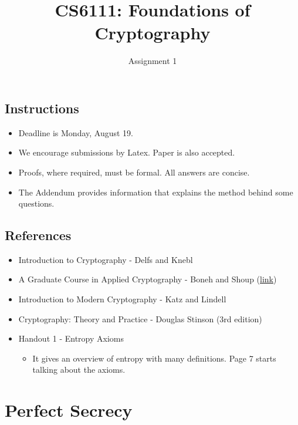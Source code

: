\documentclass[10pt]{exam}
\title{CS6111: Foundations of Cryptography}
\author{Assignment 1}
\date{}
\begin{document}
\maketitle

\subsection*{Instructions} 
\begin{itemize}
    \item Deadline is Monday, August 19.
    \item We encourage submissions by Latex. Paper is also accepted. 
    \item Proofs, where required, must be formal. All answers are concise.
    \item The Addendum provides information that explains the method behind some questions.
\end{itemize}


\subsection*{References} 
\begin{itemize}\itemsep0em
    \item Introduction to Cryptography - Delfs and Knebl
    \item A Graduate Course in Applied Cryptography - Boneh and Shoup (\href{https://crypto.stanford.edu/~dabo/cryptobook}{link})
    \item Introduction to Modern Cryptography - Katz and Lindell 
    
    \item Cryptography: Theory and Practice - Douglas Stinson (3rd edition)
    \item Handout 1 - Entropy Axioms
            \begin{itemize}
                \item It gives an overview of entropy with many definitions. Page 7 starts talking about the axioms.
            \end{itemize}
\end{itemize}

\section{Perfect Secrecy}
\end{document}
